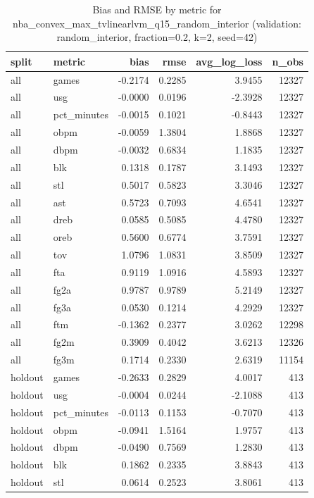 \begin{table}
\caption{Bias and RMSE by metric for nba_convex_max_tvlinearlvm_q15_random_interior (validation: random_interior, fraction=0.2, k=2, seed=42)}
\label{tab:nba_convex_max_tvlinearlvm_q15_random_interior_vs_random_interior_f20_k2_s42_bias_rmse}
\begin{tabular}{llrrrr}
\toprule
split & metric & bias & rmse & avg\_log\_loss & n\_obs \\
\midrule
all & games & -0.2174 & 0.2285 & 3.9455 & 12327 \\
all & usg & -0.0000 & 0.0196 & -2.3928 & 12327 \\
all & pct\_minutes & -0.0015 & 0.1021 & -0.8443 & 12327 \\
all & obpm & -0.0059 & 1.3804 & 1.8868 & 12327 \\
all & dbpm & -0.0032 & 0.6834 & 1.1835 & 12327 \\
all & blk & 0.1318 & 0.1787 & 3.1493 & 12327 \\
all & stl & 0.5017 & 0.5823 & 3.3046 & 12327 \\
all & ast & 0.5723 & 0.7093 & 4.6541 & 12327 \\
all & dreb & 0.0585 & 0.5085 & 4.4780 & 12327 \\
all & oreb & 0.5600 & 0.6774 & 3.7591 & 12327 \\
all & tov & 1.0796 & 1.0831 & 3.8509 & 12327 \\
all & fta & 0.9119 & 1.0916 & 4.5893 & 12327 \\
all & fg2a & 0.9787 & 0.9789 & 5.2149 & 12327 \\
all & fg3a & 0.0530 & 0.1214 & 4.2929 & 12327 \\
all & ftm & -0.1362 & 0.2377 & 3.0262 & 12298 \\
all & fg2m & 0.3909 & 0.4042 & 3.6213 & 12326 \\
all & fg3m & 0.1714 & 0.2330 & 2.6319 & 11154 \\
holdout & games & -0.2633 & 0.2829 & 4.0017 & 413 \\
holdout & usg & -0.0004 & 0.0244 & -2.1088 & 413 \\
holdout & pct\_minutes & -0.0113 & 0.1153 & -0.7070 & 413 \\
holdout & obpm & -0.0941 & 1.5164 & 1.9757 & 413 \\
holdout & dbpm & -0.0490 & 0.7569 & 1.2830 & 413 \\
holdout & blk & 0.1862 & 0.2335 & 3.8843 & 413 \\
holdout & stl & 0.0614 & 0.2523 & 3.8061 & 413 \\

\end{tabular}
\end{table}
